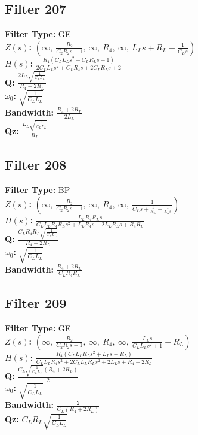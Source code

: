 \documentclass{article}
\begin{document}
\subsection*{Filter 207}
\textbf{Filter Type:} GE \\ 
\textbf{$Z(s)$:} $\left( \infty, \  \frac{R_{2}}{C_{2} R_{2} s + 1}, \  \infty, \  R_{4}, \  \infty, \  L_{L} s + R_{L} + \frac{1}{C_{L} s}\right)$ \\ 
\textbf{$H(s)$:} $\frac{R_{4} \left(C_{L} L_{L} s^{2} + C_{L} R_{L} s + 1\right)}{2 C_{L} L_{L} s^{2} + C_{L} R_{4} s + 2 C_{L} R_{L} s + 2}$ \\ 
\textbf{Q:} $\frac{2 L_{L} \sqrt{\frac{1}{C_{L} L_{L}}}}{R_{4} + 2 R_{L}}$ \\ 
\textbf{$\omega_0$:} $\sqrt{\frac{1}{C_{L} L_{L}}}$ \\ 
\textbf{Bandwidth:} $\frac{R_{4} + 2 R_{L}}{2 L_{L}}$ \\ 
\textbf{Qz:} $\frac{L_{L} \sqrt{\frac{1}{C_{L} L_{L}}}}{R_{L}}$ \\ 
\subsection*{Filter 208}
\textbf{Filter Type:} BP \\ 
\textbf{$Z(s)$:} $\left( \infty, \  \frac{R_{2}}{C_{2} R_{2} s + 1}, \  \infty, \  R_{4}, \  \infty, \  \frac{1}{C_{L} s + \frac{1}{R_{L}} + \frac{1}{L_{L} s}}\right)$ \\ 
\textbf{$H(s)$:} $\frac{L_{L} R_{4} R_{L} s}{C_{L} L_{L} R_{4} R_{L} s^{2} + L_{L} R_{4} s + 2 L_{L} R_{L} s + R_{4} R_{L}}$ \\ 
\textbf{Q:} $\frac{C_{L} R_{4} R_{L} \sqrt{\frac{1}{C_{L} L_{L}}}}{R_{4} + 2 R_{L}}$ \\ 
\textbf{$\omega_0$:} $\sqrt{\frac{1}{C_{L} L_{L}}}$ \\ 
\textbf{Bandwidth:} $\frac{R_{4} + 2 R_{L}}{C_{L} R_{4} R_{L}}$ \\ 
\subsection*{Filter 209}
\textbf{Filter Type:} GE \\ 
\textbf{$Z(s)$:} $\left( \infty, \  \frac{R_{2}}{C_{2} R_{2} s + 1}, \  \infty, \  R_{4}, \  \infty, \  \frac{L_{L} s}{C_{L} L_{L} s^{2} + 1} + R_{L}\right)$ \\ 
\textbf{$H(s)$:} $\frac{R_{4} \left(C_{L} L_{L} R_{L} s^{2} + L_{L} s + R_{L}\right)}{C_{L} L_{L} R_{4} s^{2} + 2 C_{L} L_{L} R_{L} s^{2} + 2 L_{L} s + R_{4} + 2 R_{L}}$ \\ 
\textbf{Q:} $\frac{C_{L} \sqrt{\frac{1}{C_{L} L_{L}}} \left(R_{4} + 2 R_{L}\right)}{2}$ \\ 
\textbf{$\omega_0$:} $\sqrt{\frac{1}{C_{L} L_{L}}}$ \\ 
\textbf{Bandwidth:} $\frac{2}{C_{L} \left(R_{4} + 2 R_{L}\right)}$ \\ 
\textbf{Qz:} $C_{L} R_{L} \sqrt{\frac{1}{C_{L} L_{L}}}$ \\ 
\end{document}
